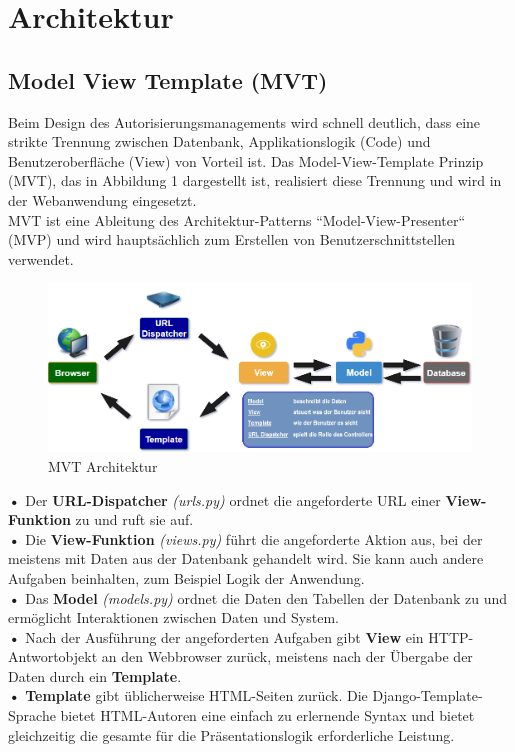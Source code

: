 \documentclass[parskip=full,11pt]{scrartcl}
\begin{document}
 
 \section{Architektur}
 
 \subsection{Model View Template (MVT)} \label{MVT}
Beim Design des Autorisierungsmanagements wird schnell deutlich, dass eine strikte Trennung zwischen Datenbank, Applikationslogik (Code) und Benutzeroberfläche (View) von Vorteil ist. Das Model-View-Template Prinzip (MVT), das in Abbildung 1 dargestellt ist, realisiert diese Trennung und wird in der Webanwendung eingesetzt.\\
MVT ist eine Ableitung des Architektur-Patterns ``Model-View-Presenter`` (MVP) und wird hauptsächlich zum Erstellen von Benutzerschnittstellen verwendet.\\
 
 
 \begin{figure}[ht!]
 \includegraphics[width=1.1\textwidth]{res/MVTdiagramm.png}
  	 	\centering
  	    \caption{MVT Architektur}
 \end{figure}
  \newpage


 	\textbf{•} Der \textbf{URL-Dispatcher} \emph{(urls.py)} ordnet die angeforderte \gls{URL} einer \textbf{View-Funktion} zu und ruft sie auf.\\
 	\textbf{•} Die \textbf{View-Funktion} \emph{(views.py)} führt die angeforderte Aktion aus, bei der meistens mit Daten aus der Datenbank gehandelt wird. Sie kann auch andere Aufgaben beinhalten, zum Beispiel Logik der Anwendung.\\
 	\textbf{•} Das \textbf{Model} \emph{(models.py)} ordnet die Daten den Tabellen der Datenbank zu und ermöglicht Interaktionen zwischen Daten und System.\\
 	\textbf{•} Nach der Ausführung der angeforderten Aufgaben gibt \textbf{View} ein HTTP-Antwortobjekt an den Webbrowser zurück, meistens nach der Übergabe der Daten durch ein \textbf{Template}.\\
 	\textbf{•} \textbf{Template} gibt üblicherweise \gls{HTML}-Seiten zurück. Die Django-Template-Sprache bietet HTML-Autoren eine einfach zu erlernende Syntax und bietet gleichzeitig die gesamte für die Präsentationslogik erforderliche Leistung. \\
 	
\end{document}
